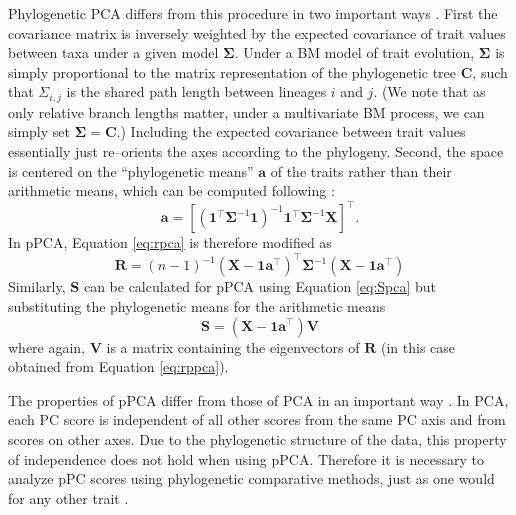 \documentclass[a4paper,11pt]{article}
\begin{document}
Phylogenetic PCA differs from this procedure in two important ways \citep{Revell2008,Polly2013} . First the covariance matrix is inversely weighted by the expected covariance of trait values between taxa under a given model $\mathbf{\Sigma}$. Under a BM model of trait evolution, $\mathbf{\Sigma}$ is simply proportional to the matrix representation of the phylogenetic tree $\mathbf{C}$, such that $\Sigma_{i,j}$ is the shared path length between lineages $i$ and $j$. (We note that as only relative branch lengths matter, under a multivariate BM process, we can simply set $\mathbf{\Sigma}=\mathbf{C}$.) Including the expected covariance between trait values essentially just re--orients the axes according to the phylogeny. Second, the space is centered on the ``phylogenetic means'' $\mathbf{a}$ of the traits rather than their arithmetic means, which can be computed following \citet{RevellHarmon2008}:
\begin{equation}\label{eq:phymean}
\mathbf{a}=[(\mathbf{1}^\intercal \mathbf{\Sigma}^{-1} \mathbf{1})^{-1} 
\mathbf{1}^\intercal \mathbf{\Sigma}^{-1} \mathbf{X}]^\intercal.
\end{equation}
In pPCA, Equation \ref{eq:rpca} is therefore modified as
\begin{equation}\label{eq:rppca}
\mathbf{R} = (n-1)^{-1}(\mathbf{X} - \mathbf{1a}^\intercal)^\intercal \mathbf{\Sigma}^{-1} (\mathbf{X} - \mathbf{1a}^\intercal)
\end{equation}
Similarly, $\mathbf{S}$ can be calculated for pPCA using Equation \ref{eq:Spca} but substituting the phylogenetic means for the arithmetic means
\begin{equation}\label{eq:Sppca}
\mathbf{S}=(\mathbf{X} - \mathbf{1a}^\intercal)\mathbf{V}
\end{equation}
where again, $\mathbf{V}$ is a matrix containing the eigenvectors of $\mathbf{R}$ (in this case obtained from Equation \ref{eq:rppca}).

The properties of pPCA differ from those of PCA in an important way \citep{Revell2008, Polly2013}. In PCA, each PC score is independent of all other scores from the same PC axis and from scores on other axes. Due to the phylogenetic structure of the data, this property of independence does not hold when using pPCA. Therefore it is necessary to analyze pPC scores using phylogenetic comparative methods, just as one would for any other trait \citep{Revell2008, Polly2013}. 
\end{document}

